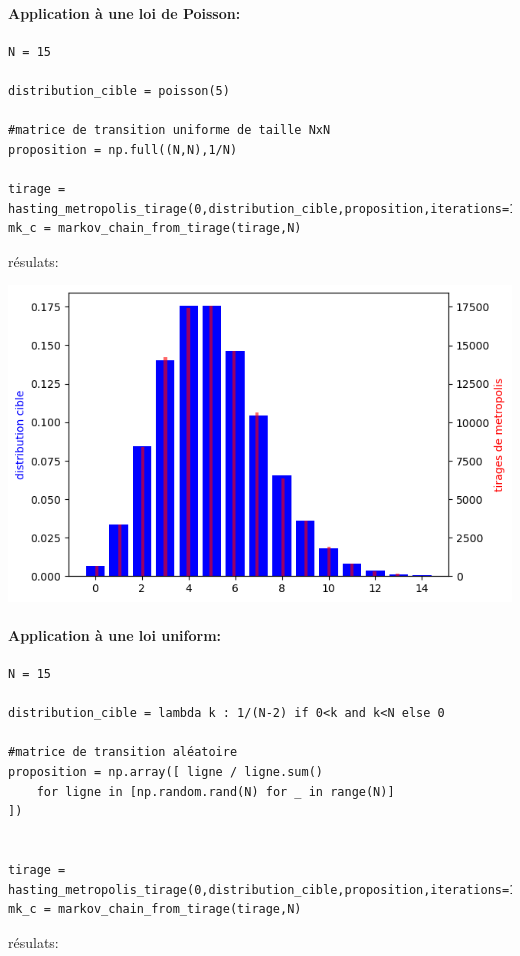 \documentclass{article}
\begin{document}
\newpage
\paragraph{Application à une loi de Poisson:}

\begin{verbatim}
N = 15

distribution_cible = poisson(5)

#matrice de transition uniforme de taille NxN
proposition = np.full((N,N),1/N)

tirage = hasting_metropolis_tirage(0,distribution_cible,proposition,iterations=100_000)
mk_c = markov_chain_from_tirage(tirage,N)
\end{verbatim}

résulats:

\includegraphics[scale=0.5]{poisson.png}

\newpage
\paragraph{Application à une loi uniform:}

\begin{verbatim}
N = 15

distribution_cible = lambda k : 1/(N-2) if 0<k and k<N else 0

#matrice de transition aléatoire
proposition = np.array([ ligne / ligne.sum()
    for ligne in [np.random.rand(N) for _ in range(N)]
])


tirage = hasting_metropolis_tirage(0,distribution_cible,proposition,iterations=100_000)
mk_c = markov_chain_from_tirage(tirage,N)
\end{verbatim}

résulats:
\end{document}
